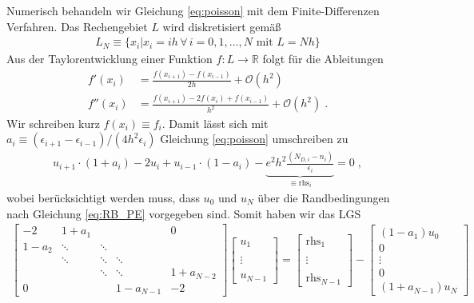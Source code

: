 Numerisch behandeln wir Gleichung \eqref{eq:poisson} mit dem Finite-Differenzen Verfahren. Das Rechengebiet $L$ wird diskretisiert gemäß
\begin{align}
  L_N \equiv \{x_i | x_i = i h \,\forall\, i = 0,1,\dots,N\text{ mit }L=Nh\}
\end{align}
Aus der Taylorentwicklung einer Funktion $f:L \rightarrow \mathbb{R}$ folgt für die Ableitungen
\begin{align}
  f'(x_i) &= \frac{f(x_{i+1}) - f(x_{i-1})}{2h} + \mathcal{O}(h^2) \\
  f''(x_i) &= \frac{f(x_{i+1}) - 2f(x_i) + f(x_{i-1})}{h^2} + \mathcal{O}(h^2) \; .
\end{align}
Wir schreiben kurz $f(x_i)\equiv f_i$.
Damit lässt sich mit $a_i\equiv (\epsilon_{i+1} - \epsilon_{i-1})/(4h^2\epsilon_i)$ Gleichung \eqref{eq:poisson} umschreiben zu
\begin{align}
  u_{i+1}\cdot(1+a_i) -2 u_i + u_{i-1}\cdot(1-a_i) - \underbrace{e^2h^2\frac{(N_{D,i} - n_i)}{\epsilon_i}}_{\equiv \text{rhs}_i} = 0\; ,
  \label{eq:discretePE}
\end{align}
wobei berücksichtigt werden muss, dass $u_0$ und $u_N$ über die Randbedingungen nach Gleichung \eqref{eq:RB_PE} vorgegeben sind. Somit haben wir das LGS
\begin{align}
  \left[ \begin{matrix}-2 & 1+a_1 & & & 0\\1-a_2 & \ddots & \ddots & & \\ & \ddots & \ddots & \ddots & \\& & \ddots & \ddots &  1+a_{N-2} \\0 & &  & 1-a_{N-1} & -2  \end{matrix}  \right]
  \left[ \begin{matrix}u_1             \\                          \\ \vdots                       \\                           \\u_{N-1}  \end{matrix}  \right]
  = \left[ \begin{matrix}\text{rhs}_1  \\                          \\ \vdots                       \\                         \\\text{rhs}_{N-1}  \end{matrix}  \right]
   - \left[ \begin{matrix}(1-a_1)u_0     \\0                         \\ \vdots                      \\0                        \\(1+a_{N-1})u_N  \end{matrix}  \right]
\end{align}
